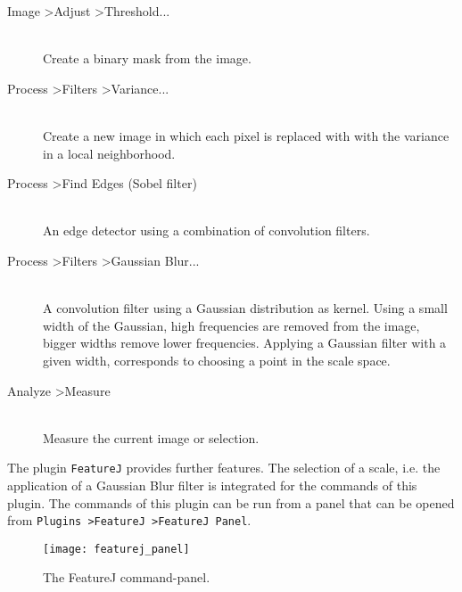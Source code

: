 \begin{description}
 \item[Image \textgreater Adjust \textgreater Threshold...] \hfill \\ 
 Create a binary mask from the image.
 \item[Process \textgreater Filters \textgreater Variance...] \hfill \\ Create a new image in which each pixel is replaced with with the variance in a local neighborhood.
 \item[Process \textgreater Find Edges (Sobel filter)] \hfill \\ An edge detector using a combination of convolution filters.
 \item[Process \textgreater Filters \textgreater Gaussian Blur...] \hfill \\ A convolution filter using a Gaussian distribution as kernel. Using a small width of the Gaussian, high frequencies are removed from the image, bigger widths remove lower frequencies. Applying a Gaussian filter with a given width, corresponds to choosing a point in the scale space.
\item[Analyze \textgreater Measure] \hfill \\
Measure the current image or selection. 
\end{description}

The plugin {\tt FeatureJ} provides further features. The selection of a scale, i.e. the application of a Gaussian Blur filter is integrated for the commands of this plugin. The commands of this plugin can be run from a panel that can be opened from {\tt Plugins \textgreater FeatureJ \textgreater FeatureJ Panel}.

\begin{figure}[!htb]
 \centering
 \texttt{[image: featurej\_panel]}
 \caption{The FeatureJ command-panel.}
 \label{figure:featurej}
\end{figure}

